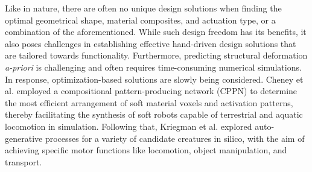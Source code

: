 
Like in nature, there are often no unique design solutions when finding the optimal geometrical shape, material composites, and actuation type, or a combination of the aforementioned. While such design freedom has its benefits, it also poses challenges in establishing effective hand-driven design solutions that are tailored towards functionality. Furthermore, predicting structural deformation \textit{a-priori} is challenging and often requires time-consuming numerical simulations. In response, optimization-based solutions are slowly being considered. Cheney et al. \cite{Cheney2013} employed a compositional pattern-producing network (CPPN) to determine the most efficient arrangement of soft material voxels and activation patterns, thereby facilitating the synthesis of soft robots capable of terrestrial and aquatic locomotion in simulation. Following that, Kriegman et al. \cite{Kriegman2020} explored auto-generative processes for a variety of candidate creatures in silico, with the aim of achieving specific motor functions like locomotion, object manipulation, and transport.


